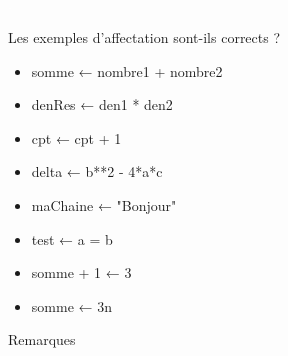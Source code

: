 \documentclass[11pt,a4paper]{article}
\begin{document}
            \par
        
			
		\subparagraph{} 
		
                \textcolor{white}{.} \par
            Les exemples d'affectation sont-ils corrects ?
						
            \begin{itemize} 
        
            \item[ \ding{"6F} ] somme ← nombre1 + nombre2
        
            \item[ \ding{"6F} ] denRes ← den1 * den2
        
            \item[ \ding{"6F} ] cpt ← cpt + 1
        
            \item[ \ding{"6F} ] delta ← b**2 - 4*a*c
        
            \item[ \ding{"6F} ] maChaine ← "Bonjour"
        
            \item[ \ding{"6F} ] test ← a = b
        
            \item[ \ding{"6F} ] somme + 1 ← 3
        
            \item[ \ding{"6F} ] somme ← 3n
        
            \end{itemize} 
        
				Remarques
				
\end{document}
